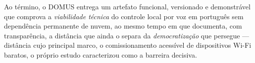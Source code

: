 Ao término, o DOMUS entrega um artefato funcional, versionado e demonstrável que
comprova a \emph{viabilidade técnica} do controle local por voz em português sem
dependência permanente de nuvem, ao mesmo tempo em que documenta, com transparência, a
distância que ainda o separa da \emph{democratização} que persegue --- distância cujo
principal marco, o comissionamento acessível de dispositivos Wi-Fi baratos, o próprio
estudo caracterizou como a barreira decisiva.
